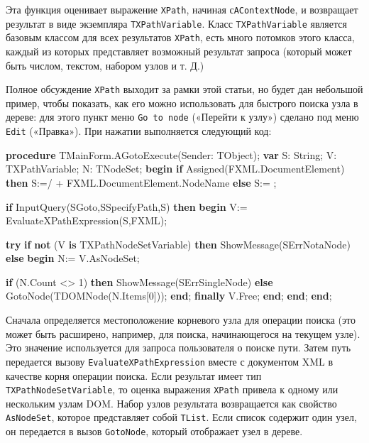 \documentclass[
]{article}
\newenvironment{Shaded}{}{}
\newcommand{\DataTypeTok}[1]{\textcolor[rgb]{0.56,0.13,0.00}{#1}}
\newcommand{\DecValTok}[1]{\textcolor[rgb]{0.25,0.63,0.44}{#1}}
\newcommand{\KeywordTok}[1]{\textcolor[rgb]{0.00,0.44,0.13}{\textbf{#1}}}
\newcommand{\NormalTok}[1]{#1}
\newcommand{\StringTok}[1]{\textcolor[rgb]{0.25,0.44,0.63}{#1}}
\begin{document}
Эта функция оценивает выражение \texttt{XPath}, начиная
с\texttt{AContextNode}, и возвращает результат в виде экземпляра
\texttt{TXPathVariable}. Класс \texttt{TXPathVariable} является базовым
классом для всех результатов \texttt{XPath}, есть много потомков этого
класса, каждый из которых представляет возможный результат запроса
(который может быть числом, текстом, набором узлов и т. Д.)

Полное обсуждение \texttt{XPath} выходит за рамки этой статьи, но будет
дан небольшой пример, чтобы показать, как его можно использовать для
быстрого поиска узла в дереве: для этого пункт меню
\texttt{Go\ to\ node} («Перейти к узлу») сделано под меню \texttt{Edit}
(«Правка»). При нажатии выполняется следующий код:

\begin{Shaded}
\begin{Highlighting}[]
\KeywordTok{procedure}\NormalTok{ TMainForm.AGotoExecute(Sender: TObject);}
\KeywordTok{var}
\NormalTok{  S: }\DataTypeTok{String}\NormalTok{;}
\NormalTok{  V: TXPathVariable;}
\NormalTok{  N: TNodeSet;}
\KeywordTok{begin}
  \KeywordTok{if}\NormalTok{ Assigned(FXML.DocumentElement) }\KeywordTok{then}
\NormalTok{    S:=}\StringTok{\textquotesingle{}/\textquotesingle{}}\NormalTok{ + FXML.DocumentElement.NodeName}
  \KeywordTok{else}
\NormalTok{    S:= }\StringTok{\textquotesingle{}\textquotesingle{}}\NormalTok{;}

  \KeywordTok{if}\NormalTok{ InputQuery(SGoto,SSpecifyPath,S) }\KeywordTok{then}
  \KeywordTok{begin}
\NormalTok{    V:= EvaluateXPathExpression(S,FXML);}

    \KeywordTok{try}
    \KeywordTok{if} \KeywordTok{not}\NormalTok{ (V }\KeywordTok{is}\NormalTok{ TXPathNodeSetVariable) }\KeywordTok{then}
\NormalTok{      ShowMessage(SErrNotaNode)}
    \KeywordTok{else}
      \KeywordTok{begin}
\NormalTok{      N:= V.AsNodeSet;}

      \KeywordTok{if}\NormalTok{ (N.Count \textless{}\textgreater{} }\DecValTok{1}\NormalTok{) }\KeywordTok{then}
\NormalTok{        ShowMessage(SErrSingleNode)}
      \KeywordTok{else}
\NormalTok{        GotoNode(TDOMNode(N.Items[}\DecValTok{0}\NormalTok{]));}
      \KeywordTok{end}\NormalTok{;}
    \KeywordTok{finally}
\NormalTok{      V.Free;}
    \KeywordTok{end}\NormalTok{;}
  \KeywordTok{end}\NormalTok{;}
\KeywordTok{end}\NormalTok{;}
\end{Highlighting}
\end{Shaded}

Сначала определяется местоположение корневого узла для операции поиска
(это может быть расширено, например, для поиска, начинающегося на
текущем узле). Это значение используется для запроса пользователя о
поиске пути. Затем путь передается вызову
\texttt{EvaluateXPathExpression} вместе с документом XML в качестве
корня операции поиска. Если результат имеет тип
\texttt{TXPathNodeSetVariable}, то оценка выражения \texttt{XPath}
привела к одному или нескольким узлам DOM. Набор узлов результата
возвращается как свойство \texttt{AsNodeSet}, которое представляет собой
\texttt{TList}. Если список содержит один узел, он передается в вызов
\texttt{GotoNode}, который отображает узел в дереве.
\end{document}
